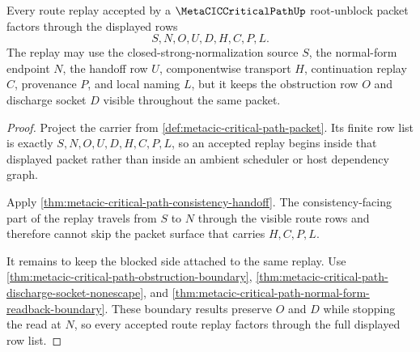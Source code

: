 \begin{theorem}
\label{thm:metacic-critical-path-route-replay-coverage}
Every route replay accepted by a $\MetaCICCriticalPathUp$ root-unblock packet factors through the displayed rows
$$
S,N,O,U,D,H,C,P,L.
$$
The replay may use the closed-strong-normalization source $S$, the normal-form endpoint $N$, the handoff row $U$, componentwise transport $H$, continuation replay $C$, provenance $P$, and local naming $L$, but it keeps the obstruction row $O$ and discharge socket $D$ visible throughout the same packet.
\end{theorem}
\begin{proof}
Project the carrier from \autoref{def:metacic-critical-path-packet}. Its finite row list is exactly $S,N,O,U,D,H,C,P,L$, so an accepted replay begins inside that displayed packet rather than inside an ambient scheduler or host dependency graph.

Apply \autoref{thm:metacic-critical-path-consistency-handoff}. The consistency-facing part of the replay travels from $S$ to $N$ through the visible route rows and therefore cannot skip the packet surface that carries $H,C,P,L$.

It remains to keep the blocked side attached to the same replay. Use \autoref{thm:metacic-critical-path-obstruction-boundary}, \autoref{thm:metacic-critical-path-discharge-socket-nonescape}, and \autoref{thm:metacic-critical-path-normal-form-readback-boundary}. These boundary results preserve $O$ and $D$ while stopping the read at $N$, so every accepted route replay factors through the full displayed row list.
\end{proof}

